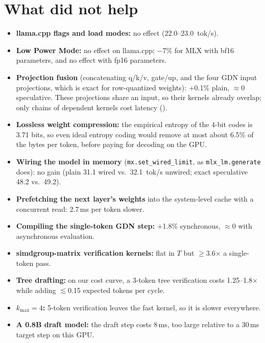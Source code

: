 \documentclass[11pt]{article}
\begin{document}
\section{What did not help}
\label{sec:negative}
\begin{itemize}
\item \textbf{llama.cpp flags and load modes:} no effect (22.0--23.0~tok/s).
\item \textbf{Low Power Mode:} no effect on llama.cpp; $-$7\% for MLX with bf16 parameters, and no effect with fp16 parameters.
\item \textbf{Projection fusion} (concatenating q/k/v, gate/up, and the four GDN input projections, which is exact for row-quantized weights): $+$0.1\% plain, $\approx$0 speculative. These projections share an input, so their kernels already overlap; only chains of dependent kernels cost latency ().
\item \textbf{Lossless weight compression:} the empirical entropy of the 4-bit codes is 3.71 bits, so even ideal entropy coding would remove at most about 6.5\% of the bytes per token, before paying for decoding on the GPU.
\item \textbf{Wiring the model in memory} (\texttt{mx.set\_wired\_limit}, as \texttt{mlx\_lm.generate} does): no gain (plain 31.1 wired vs.\ 32.1~tok/s unwired; exact speculative 48.2 vs.\ 49.2).
\item \textbf{Prefetching the next layer's weights} into the system-level cache with a concurrent read: 2.7\,ms per token slower.
\item \textbf{Compiling the single-token GDN step:} $+$1.8\% synchronous, $\approx$0 with asynchronous evaluation.
\item \textbf{simdgroup-matrix verification kernels:} flat in $T$ but $\ge$3.6$\times$ a single-token pass.
\item \textbf{Tree drafting:} on our cost curve, a 3-token tree verification costs 1.25--1.8$\times$ while adding $\lesssim$0.15 expected tokens per cycle.
\item \textbf{$k_{\max}{=}4$:} 5-token verification leaves the fast kernel, so it is slower everywhere.
\item \textbf{A 0.8B draft model:} the draft step costs 8\,ms, too large relative to a 30\,ms target step on this GPU.
\end{itemize}


\end{document}
